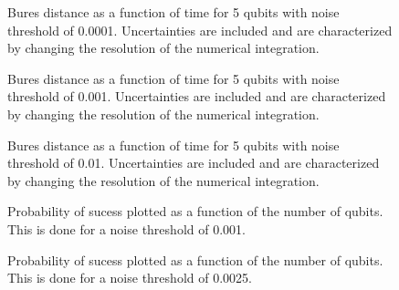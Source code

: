 \pagebreak

\begin{figure}
\begin{center}
\end{center}
\caption{Bures distance as a function of time for 5 qubits with noise
threshold of 0.0001.  Uncertainties are included and are characterized 
by changing the resolution of the numerical integration.}
\end{figure}

\pagebreak

\begin{figure}
\begin{center}
\end{center}
\caption{Bures distance as a function of time for 5 qubits with noise
threshold of 0.001.  Uncertainties are included and are characterized 
by changing the resolution of the numerical integration.}
\end{figure}

\pagebreak

\begin{figure}
\begin{center}
\end{center}
\caption{Bures distance as a function of time for 5 qubits with noise
threshold of 0.01.  Uncertainties are included and are characterized 
by changing the resolution of the numerical integration.}
\end{figure}

\pagebreak


\begin{figure}
\begin{center}
\end{center}
\caption{Probability of sucess plotted as a function of the number of qubits. This
is done for a noise threshold of 0.001.}
\end{figure}

\pagebreak

\begin{figure}
\begin{center}
\end{center}
\caption{Probability of sucess plotted as a function of the number of qubits. This
is done for a noise threshold of 0.0025.}
\end{figure}

